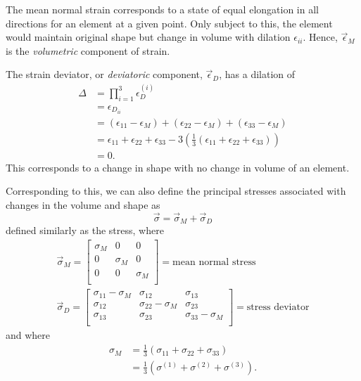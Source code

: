 The mean normal strain corresponds to a state of equal elongation in all directions for an element at a given point.
Only subject to this, the element would maintain original shape but change in volume with dilation $\epsilon_{ii}$.
Hence, $\Vec{\epsilon}_M$ is the \textit{volumetric} component of strain.

The strain deviator, or \textit{deviatoric} component, $\Vec{\epsilon}_D$, has a dilation of
\begin{align*}
  \Delta &= \prod_{i = 1}^{3} \epsilon_D^{(i)} \\
  &= \epsilon_{D_{ii}} \\
  &= \left( \epsilon_{11}  -\epsilon_M \right) + \left( \epsilon_{22} - \epsilon_M \right) + \left( \epsilon_{33} - \epsilon_M \right) \\
  &= \epsilon_{11} + \epsilon_{22} + \epsilon_{33} - 3 \left( \frac{1}{3} \left( \epsilon_{11} + \epsilon_{22} + \epsilon_{33} \right) \right) \\
  &= 0
.\end{align*}
This corresponds to a change in shape with no change in volume of an element.

Corresponding to this, we can also define the principal stresses associated with changes in the volume and shape as
\begin{equation*}
  \Vec{\sigma} = \Vec{\sigma}_M + \Vec{\sigma}_D
\end{equation*}
defined similarly as the stress, where
\begin{gather*}
  \Vec{\sigma}_M = \begin{bmatrix}
    \sigma_M & 0 & 0\\
  0 & \sigma_M & 0\\
  0 & 0 & \sigma_M\\
  \end{bmatrix} = \text{mean normal stress} \\
  \Vec{\sigma}_D = \begin{bmatrix}
    \sigma_{11} - \sigma_M & \sigma_{12} & \sigma_{13}\\
  \sigma_{12} & \sigma_{22} - \sigma_M & \sigma_{23}\\
  \sigma_{13} & \sigma_{23} & \sigma_{33} - \sigma_M\\
  \end{bmatrix} = \text{stress deviator}
\end{gather*}
and where
\begin{align*}
  \sigma_M &= \frac{1}{3} \left( \sigma_{11} + \sigma_{22} + \sigma_{33} \right) \\
           &= \frac{1}{3} \left( \sigma^{(1)} + \sigma^{(2)} + \sigma^{(3)} \right)
.\end{align*}

